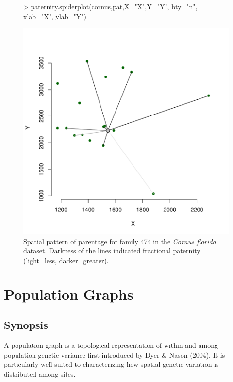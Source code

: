 \documentclass[letterpaper,twoside,openany]{book}
\begin{document}
\begin{figure}
	\centering
\begin{Schunk}
\begin{Sinput}
> paternity.spiderplot(cornus,pat,X="X",Y="Y", bty="n", xlab="X", ylab="Y")
\end{Sinput}
\end{Schunk}
\includegraphics{gstudio-061}
	\caption{Spatial pattern of parentage for family 474 in the \emph{Cornus florida} dataset.  Darkness of the lines indicated fractional paternity (light=less, darker=greater).}
\end{figure}


\chapter{Population Graphs}

\section{Synopsis}

A population graph is a topological representation of within and among population genetic variance first introduced by Dyer \& Nason (2004).  It is particularly well suited to characterizing how spatial genetic variation is distributed among sites.
\end{document}

